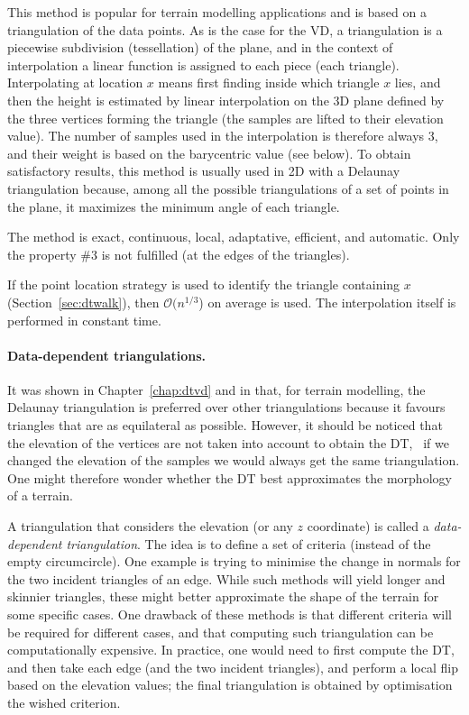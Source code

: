 This method is popular for terrain modelling applications and is based on a triangulation of the data points. 
As is the case for the VD, a triangulation is a piecewise subdivision (tessellation) of the plane, and in the context of interpolation a linear function is assigned to each piece (each triangle). 
Interpolating at location $x$ means first finding inside which triangle $x$ lies, and then the height is estimated by linear interpolation on the 3D plane defined by the three vertices forming the triangle (the samples are lifted to their elevation value). 
The number of samples used in the interpolation is therefore always 3, and their weight is based on the barycentric value (see below).
To obtain satisfactory results, this method is usually used in 2D with a Delaunay triangulation because, among all the possible triangulations of a set of points in the plane, it maximizes the minimum angle of each triangle. 

The method is exact, continuous, local, adaptative, efficient, and automatic.
Only the property \#3 is not fulfilled (at the edges of the triangles).

If the point location strategy is used to identify the triangle containing $x$ (Section~\ref{sec:dtwalk}), then $\mathcal{O}(n^{1/3}$) on average is used.
The interpolation itself is performed in constant time.


\paragraph{Data-dependent triangulations.}
It was shown in Chapter~\ref{chap:dtvd} and in  that, for terrain modelling, the Delaunay triangulation is preferred over other triangulations because it favours triangles that are as equilateral as possible.
However, it should be noticed that the elevation of the vertices are not taken into account to obtain the DT, \ie\ if we changed the elevation of the samples we would always get the same triangulation.
One might therefore wonder whether the DT best approximates the morphology of a terrain.

A triangulation that considers the elevation (or any $z$ coordinate) is called a \emph{data-dependent triangulation}.
The idea is to define a set of criteria (instead of the empty circumcircle).
One example is trying to minimise the change in normals for the two incident triangles of an edge.
While such methods will yield longer and skinnier triangles, these might better approximate the shape of the terrain for some specific cases.
One drawback of these methods is that different criteria will be required for different cases, and that computing such triangulation can be computationally expensive.
In practice, one would need to first compute the DT, and then take each edge (and the two incident triangles), and perform a local flip based on the elevation values; the final triangulation is obtained by optimisation the wished criterion.



